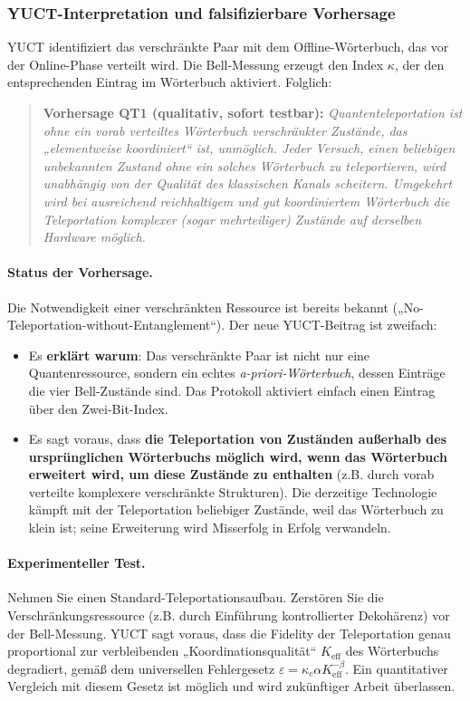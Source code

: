\documentclass[12pt,a4paper]{article}
\theoremstyle{remark}
\begin{document}
	\subsubsection{YUCT-Interpretation und falsifizierbare Vorhersage}
	
	YUCT identifiziert das verschränkte Paar mit dem Offline-Wörterbuch, das vor der Online-Phase verteilt wird. Die Bell-Messung erzeugt den Index $\kappa$, der den entsprechenden Eintrag im Wörterbuch aktiviert. Folglich:
	
	\begin{quote}
		\textbf{Vorhersage QT1 (qualitativ, sofort testbar):}
		\emph{Quantenteleportation ist ohne ein vorab verteiltes Wörterbuch verschränkter Zustände, das „elementweise koordiniert“ ist, unmöglich. Jeder Versuch, einen beliebigen unbekannten Zustand ohne ein solches Wörterbuch zu teleportieren, wird unabhängig von der Qualität des klassischen Kanals scheitern. Umgekehrt wird bei ausreichend reichhaltigem und gut koordiniertem Wörterbuch die Teleportation komplexer (sogar mehrteiliger) Zustände auf derselben Hardware möglich.}
	\end{quote}
	
	\paragraph{Status der Vorhersage.}
	Die Notwendigkeit einer verschränkten Ressource ist bereits bekannt („No-Teleportation-without-Entanglement“). Der neue YUCT-Beitrag ist zweifach:
	
	\begin{itemize}
		\item Es \textbf{erklärt warum}: Das verschränkte Paar ist nicht nur eine Quantenressource, sondern ein echtes \emph{a-priori-Wörterbuch}, dessen Einträge die vier Bell-Zustände sind. Das Protokoll aktiviert einfach einen Eintrag über den Zwei-Bit-Index.
		\item Es sagt voraus, dass \textbf{die Teleportation von Zuständen außerhalb des ursprünglichen Wörterbuchs möglich wird, wenn das Wörterbuch erweitert wird, um diese Zustände zu enthalten} (z.B. durch vorab verteilte komplexere verschränkte Strukturen). Die derzeitige Technologie kämpft mit der Teleportation beliebiger Zustände, weil das Wörterbuch zu klein ist; seine Erweiterung wird Misserfolg in Erfolg verwandeln.
	\end{itemize}
	
	\paragraph{Experimenteller Test.}
	Nehmen Sie einen Standard-Teleportationsaufbau. Zerstören Sie die Verschränkungsressource (z.B. durch Einführung kontrollierter Dekohärenz) vor der Bell-Messung. YUCT sagt voraus, dass die Fidelity der Teleportation genau proportional zur verbleibenden „Koordinationsqualität“ $K_{\mathrm{eff}}$ des Wörterbuchs degradiert, gemäß dem universellen Fehlergesetz $\varepsilon = \kappa_c \alpha K_{\mathrm{eff}}^{-\beta}$. Ein quantitativer Vergleich mit diesem Gesetz ist möglich und wird zukünftiger Arbeit überlassen.
	
\end{document}
